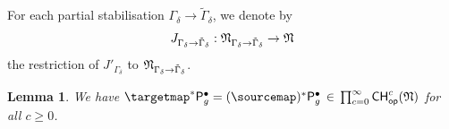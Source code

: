 \documentclass[a4paper,12pt]{article} %
\def\P{\mathsf{P}}
\def\qed{{\hfill $\Diamond$}}
\theoremstyle{definition}
\theoremstyle{plain}%
\newtheorem{lemma}[definition]{Lemma}
\begin{document}



For each partial stabilisation $\Gamma_{\delta}\to \tilde{\Gamma}_{\delta}$, we denote by $$J_{\Gamma_{\delta}\to\tilde{\Gamma}_{\delta}}: \frak N_{\Gamma_{\delta}\to\tilde{\Gamma}_{\delta}}\to \frak N$$ the restriction of $J'_{\Gamma_{\delta}}$ to $\frak N_{\Gamma_{\delta}\to \tilde{\Gamma}_{\delta}}$.  
\begin{lemma}\label{lem:N_invariance_P}
We have $\targetmap^* \P_{g}^\bullet = (\sourcemap)^* \P_g^\bullet
\, \in\, \prod_{c=0}^\infty {\mathsf{CH}}^c_{\mathsf{op}}(\frak N)$
for all $c \geq 0$. 
\end{lemma}
\end{document}
